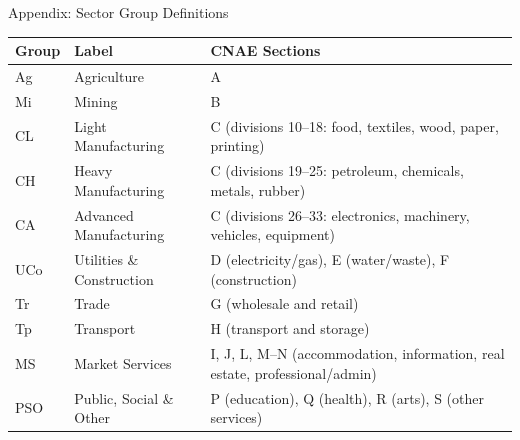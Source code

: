 \documentclass[aspectratio=169,11pt]{beamer}
\begin{document}
\begin{frame}{Appendix: Sector Group Definitions}

\footnotesize
\begin{center}
\begin{tabular}{llp{7.5cm}}
\toprule
\textbf{Group} & \textbf{Label} & \textbf{CNAE Sections} \\
\midrule
Ag  & Agriculture               & A \\
Mi  & Mining                    & B \\
CL  & Light Manufacturing       & C (divisions 10--18: food, textiles, wood, paper, printing) \\
CH  & Heavy Manufacturing       & C (divisions 19--25: petroleum, chemicals, metals, rubber) \\
CA  & Advanced Manufacturing    & C (divisions 26--33: electronics, machinery, vehicles, equipment) \\
UCo & Utilities \& Construction & D (electricity/gas), E (water/waste), F (construction) \\
Tr  & Trade                     & G (wholesale and retail) \\
Tp  & Transport                 & H (transport and storage) \\
MS  & Market Services           & I, J, L, M--N (accommodation, information, real estate, professional/admin) \\
PSO & Public, Social \& Other   & P (education), Q (health), R (arts), S (other services) \\
\bottomrule
\end{tabular}
\end{center}

\hfill\hyperlink{slide:datasources}{}

\end{frame}
\end{document}
